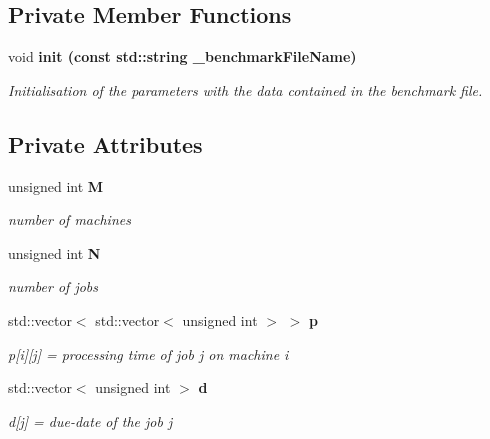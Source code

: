 \subsection*{Private Member Functions}
\begin{CompactItemize}
\item 
void \bf{init} (const std::string \_\-benchmark\-File\-Name)
\begin{CompactList}\small\item\em Initialisation of the parameters with the data contained in the benchmark file. \item\end{CompactList}\end{CompactItemize}
\subsection*{Private Attributes}
\begin{CompactItemize}
\item 
unsigned int \bf{M}\label{classFlowShopBenchmarkParser_4cc02556c751afe32e8800544160c7c7}

\begin{CompactList}\small\item\em number of machines \item\end{CompactList}\item 
unsigned int \bf{N}\label{classFlowShopBenchmarkParser_fb220e40e9f94e3c1d3a7eb437aeffce}

\begin{CompactList}\small\item\em number of jobs \item\end{CompactList}\item 
std::vector$<$ std::vector$<$ unsigned int $>$ $>$ \bf{p}\label{classFlowShopBenchmarkParser_4c1ce3d710b6605ddcc723101b808de5}

\begin{CompactList}\small\item\em p[i][j] = processing time of job j on machine i \item\end{CompactList}\item 
std::vector$<$ unsigned int $>$ \bf{d}\label{classFlowShopBenchmarkParser_8898519f54465b2d23a846053363bf4b}

\begin{CompactList}\small\item\em d[j] = due-date of the job j \item\end{CompactList}\end{CompactItemize}



